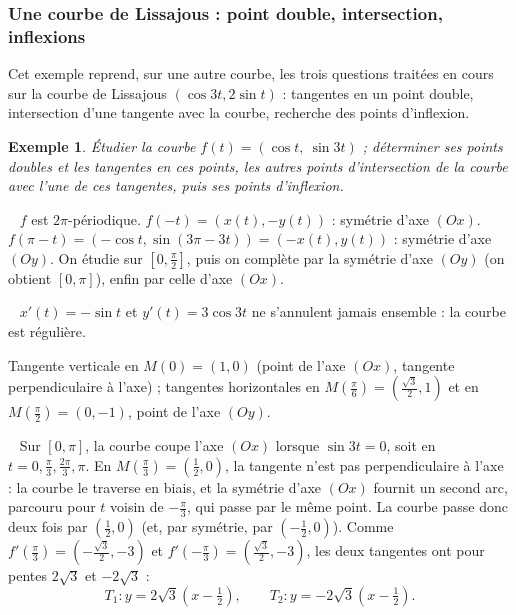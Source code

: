\documentclass[a4paper,11pt]{article}
\numberwithin{equation}{section}
\numberwithin{figure}{section}
\numberwithin{table}{section}
\theoremstyle{enonce}
\theoremstyle{exemple}
\newtheorem{exemple}[definition]{Exemple}
\theoremstyle{remarque}
\newcommand{\etape}[1]{\par\smallskip\noindent{\sffamily\bfseries\small\color{BleuMoyen}#1.}\ }
\begin{document}
\subsubsection{Une courbe de Lissajous : point double, intersection, inflexions}

Cet exemple reprend, sur une autre courbe, les trois questions traitées en cours sur la courbe de Lissajous
$(\cos3t,2\sin t)$ : tangentes en un point double, intersection d'une tangente avec la courbe, recherche des points
d'inflexion.

\begin{exemple}\label{ex:g7}
Étudier la courbe $f(t)=(\cos t,\ \sin3t)$ ; déterminer ses points doubles et les tangentes en ces points, les autres
points d'intersection de la courbe avec l'une de ces tangentes, puis ses points d'inflexion.
\end{exemple}

\etape{Réduction} $f$ est $2\pi$-périodique. $f(-t)=(x(t),-y(t))$ : symétrie d'axe $(Ox)$. $f(\pi-t)=(-\cos t,\sin(3\pi-3t))=
(-x(t),y(t))$ : symétrie d'axe $(Oy)$. On étudie sur $\left[0,\frac\pi2\right]$, puis on complète par la symétrie d'axe
$(Oy)$ (on obtient $[0,\pi]$), enfin par celle d'axe $(Ox)$.

\etape{Variations} $x'(t)=-\sin t$ et $y'(t)=3\cos3t$ ne s'annulent jamais ensemble : la courbe est régulière.
\begin{center}
\end{center}
Tangente verticale en $M(0)=(1,0)$ (point de l'axe $(Ox)$, tangente perpendiculaire à l'axe) ; tangentes horizontales en
$M\left(\frac\pi6\right)=\left(\frac{\sqrt3}2,1\right)$ et en $M\left(\frac\pi2\right)=(0,-1)$, point de l'axe $(Oy)$.

\etape{Point double} Sur $[0,\pi]$, la courbe coupe l'axe $(Ox)$ lorsque $\sin3t=0$, soit en $t=0,\frac\pi3,\frac{2\pi}3,\pi$.
En $M\left(\frac\pi3\right)=\left(\frac12,0\right)$, la tangente n'est pas perpendiculaire à l'axe : la courbe le traverse
en biais, et la symétrie d'axe $(Ox)$ fournit un second arc, parcouru pour $t$ voisin de $-\frac\pi3$, qui passe par le même
point. La courbe passe donc deux fois par
$\left(\frac12,0\right)$ (et, par symétrie, par $\left(-\frac12,0\right)$). Comme $f'\left(\frac\pi3\right)=\left(-\frac{\sqrt3}2,-3\right)$ et
$f'\left(-\frac\pi3\right)=\left(\frac{\sqrt3}2,-3\right)$, les deux tangentes ont pour pentes $2\sqrt3$ et $-2\sqrt3$ :
\[T_1:y=2\sqrt3\left(x-\tfrac12\right),\qquad T_2:y=-2\sqrt3\left(x-\tfrac12\right).\]
\end{document}
